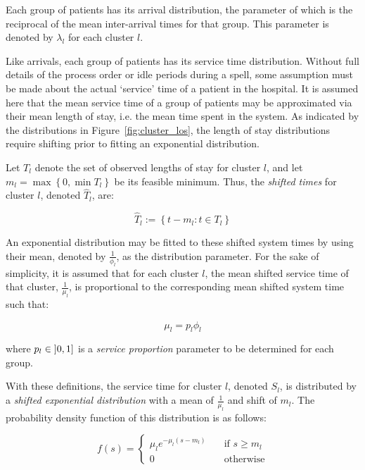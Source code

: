 \documentclass[]{interact}
\theoremstyle{plain}%
\theoremstyle{definition}
\theoremstyle{remark}
\begin{document}
Each group of patients has its arrival distribution, the parameter of which is
the reciprocal of the mean inter-arrival times for that group. This parameter
is denoted by \(\lambda_l\) for each cluster \(l\).

Like arrivals, each group of patients has its service time distribution.
Without full details of the process order or idle periods during a spell, some
assumption must be made about the actual `service' time of a patient in the
hospital. It is assumed here that the mean service time of a group of patients
may be approximated via their mean length of stay, i.e. the mean time spent in
the system. As indicated by the distributions in Figure~\ref{fig:cluster_los},
the length of stay distributions require shifting prior to fitting an
exponential distribution.

Let \(T_l\) denote the set of observed lengths of stay for cluster \(l\), and
let \(m_l = \max \left\{0, \min T_l\right\}\) be its feasible minimum. Thus, the
\emph{shifted times} for cluster \(l\), denoted \(\widehat T_l\), are:

\begin{equation}\label{eq:shifted}
    \widehat T_l := \left\{t - m_l : t \in T_l\right\}
\end{equation}

An exponential distribution may be fitted to these shifted system times by
using their mean, denoted by \(\frac{1}{\phi_l}\), as the distribution
parameter. For the sake of simplicity, it is assumed that for each cluster
\(l\), the mean shifted service time of that cluster, \(\frac{1}{\mu_l}\), is
proportional to the corresponding mean shifted system time such that:

\begin{equation}\label{eq:shifted_services}
    \mu_l = p_l \phi_l
\end{equation}

\noindent where \(p_l \in \interval[open left]{0}{1}\) is a {\slshape service
proportion} parameter to be determined for each group.

With these definitions, the service time for cluster \(l\), denoted \(S_l\), is
distributed by a {\slshape shifted exponential distribution} with a mean of
\(\frac{1}{\mu_l}\) and shift of \(m_l\). The probability density function
of this distribution is as follows:

\begin{equation}\label{eq:shifted_pdf}
    f(s) = \begin{cases}
        \mu_l e^{-\mu_l (s - m_l)} & \quad \text{if \(s \ge m_l\)}\\
        0 & \quad \text{otherwise}
    \end{cases}
\end{equation}
\end{document}
